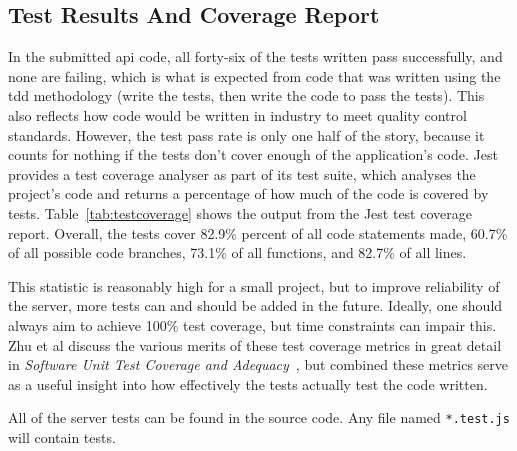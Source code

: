\subsection{Test Results And Coverage Report}

In the submitted \acrshort{api} code, all forty-six of the tests written pass
successfully, and none are failing, which is what is expected from code that
was written using the \acrfull{tdd} methodology (write the tests, then write
the code to pass the tests). This also reflects how code would be written in
industry to meet quality control standards. However, the test pass rate is
only one half of the story, because it counts for nothing if the tests don't
cover enough of the application's code. Jest provides a test coverage
analyser as part of its test suite, which analyses the project's code and
returns a percentage of how much of the code is covered by tests.
Table~\ref{tab:testcoverage} shows the output from the Jest test coverage
report. Overall, the tests cover 82.9\% percent of all code statements made,
60.7\% of all possible code branches, 73.1\% of all functions, and 82.7\% of
all lines.

This statistic is reasonably high for a small project, but to improve
reliability of the server, more tests can and should be added in the future.
Ideally, one should always aim to achieve 100\% test coverage, but time
constraints can impair this. Zhu et al discuss the various merits of these
test coverage metrics in great detail in \textit{Software Unit Test Coverage
and Adequacy}~\cite{zhu1997software}, but combined these metrics serve as a
useful insight into how effectively the tests actually test the code written.

All of the server tests can be found in the source code. Any file named
\texttt{*.test.js} will contain tests.

